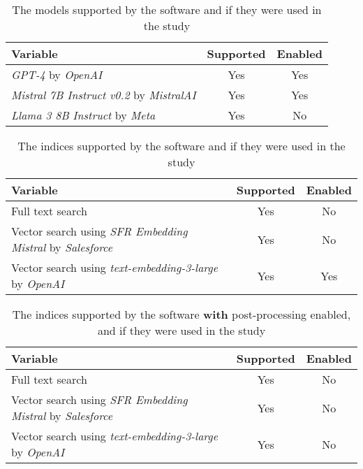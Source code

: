 \begin{table}[H]
\centering
{\footnotesize
\begin{tabularx}{\textwidth}{@{}Xcc@{}}
\toprule
\textbf{Variable} & \textbf{Supported} & \textbf{Enabled} \\ \midrule
\textit{GPT-4} by \textit{OpenAI}              & Yes & Yes \\
\textit{Mistral 7B Instruct v0.2} by \textit{MistralAI} & Yes & Yes \\
\textit{Llama 3 8B Instruct} by \textit{Meta} & Yes & No  \\
\bottomrule
\end{tabularx}
}
\vspace{2mm}
\caption{The models supported by the software and if they were used in the study}
\label{tab:models_supported}
\end{table}


\begin{table}[H]
\centering
{\footnotesize
\begin{tabularx}{\textwidth}{@{}Xcc@{}}
\toprule
\textbf{Variable} & \textbf{Supported} & \textbf{Enabled} \\ \midrule
Full text search              & Yes & No \\
Vector search using \textit{SFR Embedding Mistral} by \textit{Salesforce}              & Yes & No \\
Vector search using \textit{text-embedding-3-large} by \textit{OpenAI}              & Yes & Yes \\
\bottomrule
\end{tabularx}
}
\vspace{2mm}
\caption{The indices supported by the software and if they were used in the study}
\label{tab:indicies_supported}
\end{table}


\begin{table}[H]
\centering
{\footnotesize
\begin{tabularx}{\textwidth}{@{}Xcc@{}}
\toprule
\textbf{Variable} & \textbf{Supported} & \textbf{Enabled} \\ \midrule
Full text search              & Yes & No \\
Vector search using \textit{SFR Embedding Mistral} by \textit{Salesforce}              & Yes & No \\
Vector search using \textit{text-embedding-3-large} by \textit{OpenAI}              & Yes & No \\
\bottomrule
\end{tabularx}
}
\vspace{2mm}
\caption{The indices supported by the software \textbf{with} post-processing enabled, and if they were used in the study}
\label{tab:indicies_supported_with_postprocessing}
\end{table}
